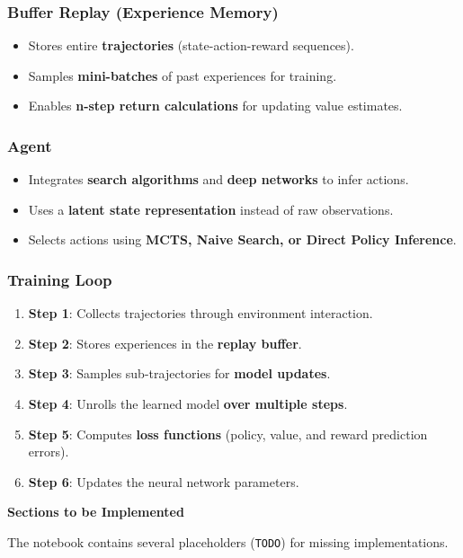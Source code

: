 \subsubsection{Buffer Replay (Experience Memory)}
\begin{itemize}
    \item Stores entire \textbf{trajectories} (state-action-reward sequences).
    \item Samples \textbf{mini-batches} of past experiences for training.
    \item Enables \textbf{n-step return calculations} for updating value estimates.
\end{itemize}

\subsubsection{Agent}
\begin{itemize}
    \item Integrates \textbf{search algorithms} and \textbf{deep networks} to infer actions.
    \item Uses a \textbf{latent state representation} instead of raw observations.
    \item Selects actions using \textbf{MCTS, Naive Search, or Direct Policy Inference}.
\end{itemize}

\subsubsection{Training Loop}
\begin{enumerate}
    \item \textbf{Step 1}: Collects trajectories through environment interaction.
    \item \textbf{Step 2}: Stores experiences in the \textbf{replay buffer}.
    \item \textbf{Step 3}: Samples sub-trajectories for \textbf{model updates}.
    \item \textbf{Step 4}: Unrolls the learned model \textbf{over multiple steps}.
    \item \textbf{Step 5}: Computes \textbf{loss functions} (policy, value, and reward prediction errors).
    \item \textbf{Step 6}: Updates the neural network parameters.
\end{enumerate}

\textbf{Sections to be Implemented}

The notebook contains several placeholders (\texttt{TODO}) for missing implementations.
